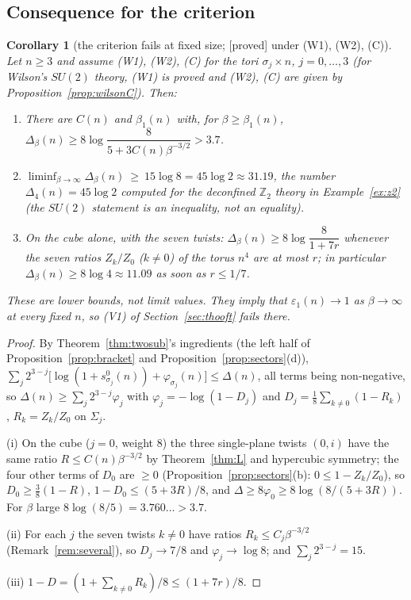 \documentclass[11pt,a4paper]{article}
\theoremstyle{plain}
\newtheorem{corollary}[theorem]{Corollary}
\theoremstyle{definition}
\theoremstyle{remark}
\numberwithin{equation}{section}
\newcommand{\Z}{\mathbb{Z}}
\newcommand{\st}[1]{\textsf{[#1]}}
\begin{document}
\subsection{Consequence for the criterion}
\begin{corollary}[the criterion fails at fixed size; \st{proved} under (W1), (W2), (C)]\label{cor:L1}
Let $n\ge3$ and assume (W1), (W2), (C) for the tori $\sigma_j\times n$, $j=0,\dots,3$ (for Wilson's $SU(2)$ theory, (W1) is proved and (W2), (C) are given by Proposition~\ref{prop:wilsonC}). Then:
\begin{enumerate}
\item[(i)] There are $C(n)$ and $\beta_1(n)$ with, for $\beta\ge\beta_1(n)$, $\Delta_\beta(n)\ge8\log\dfrac{8}{5+3C(n)\beta^{-3/2}}>3.7$.
\item[(ii)] $\displaystyle\liminf_{\beta\to\infty}\Delta_\beta(n)\ \ge\ 15\log8=45\log2\approx31.19$, the number $\Delta_4(n)=45\log2$ computed for the deconfined $\Z_2$ theory in Example~\ref{ex:z2} (the $SU(2)$ statement is an inequality, not an equality).
\item[(iii)] On the cube alone, with the seven twists: $\Delta_\beta(n)\ge8\log\dfrac{8}{1+7r}$ whenever the seven ratios $Z_k/Z_0$ ($k\ne0$) of the torus $n^4$ are at most $r$; in particular $\Delta_\beta(n)\ge8\log4\approx11.09$ as soon as $r\le1/7$.
\end{enumerate}
These are lower bounds, not limit values. They imply that $\varepsilon_1(n)\to1$ as $\beta\to\infty$ at every fixed $n$, so (V1) of Section~\ref{sec:thooft} fails there.
\end{corollary}
\begin{proof}
By Theorem~\ref{thm:twosub}'s ingredients (the left half of Proposition~\ref{prop:bracket} and Proposition~\ref{prop:sectors}(d)), $\sum_j2^{3-j}\bigl[\log(1+s^0_{\sigma_j}(n))+\varphi_{\sigma_j}(n)\bigr]\le\Delta(n)$, all terms being non-negative, so $\Delta(n)\ge\sum_j2^{3-j}\varphi_j$ with $\varphi_j=-\log(1-D_j)$ and $D_j=\frac18\sum_{k\ne0}(1-R_k)$, $R_k=Z_k/Z_0$ on $\Sigma_j$.

(i) On the cube ($j=0$, weight $8$) the three single-plane twists $(0,i)$ have the same ratio $R\le C(n)\beta^{-3/2}$ by Theorem~\ref{thm:L} and hypercubic symmetry; the four other terms of $D_0$ are $\ge0$ (Proposition~\ref{prop:sectors}(b): $0\le1-Z_k/Z_0$), so $D_0\ge\frac38(1-R)$, $1-D_0\le(5+3R)/8$, and $\Delta\ge8\varphi_0\ge8\log(8/(5+3R))$. For $\beta$ large $8\log(8/5)=3.760\ldots>3.7$.

(ii) For each $j$ the seven twists $k\ne0$ have ratios $R_k\le C_j\beta^{-3/2}$ (Remark~\ref{rem:several}), so $D_j\to7/8$ and $\varphi_j\to\log8$; and $\sum_j2^{3-j}=15$.

(iii) $1-D=(1+\sum_{k\ne0}R_k)/8\le(1+7r)/8$.
\end{proof}
\end{document}

